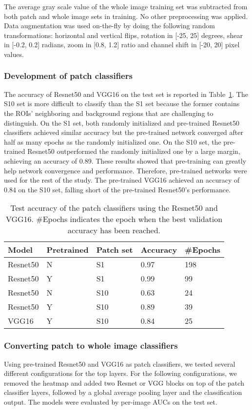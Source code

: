 \documentclass[12pt,letterpaper]{article}
\begin{document}
The average gray scale value of the whole image training set was subtracted from both patch and whole image sets in training. No other preprocessing was applied. Data augmentation was used on-the-fly by doing the following random transformations: horizontal and vertical flips, rotation in [-25, 25] degrees, shear in [-0.2, 0.2] radians, zoom in [0.8, 1.2] ratio and channel shift in [-20, 20] pixel values. 

\subsubsection{Development of patch classifiers}
The accuracy of Resnet50 and VGG16 on the test set is reported in Table~\ref{tab:patch_acc}. The S10 set is more difficult to classify than the S1 set because the former contains the ROIs' neighboring and background regions that are challenging to distinguish. On the S1 set, both randomly initialized and pre-trained Resnet50 classifiers achieved similar accuracy but the pre-trained network converged after half as many epochs as the randomly initialized one. On the S10 set, the pre-trained Resnet50 outperformed the randomly initialized one by a large margin, achieving an accuracy of 0.89. These results showed that pre-training can greatly help network convergence and performance. Therefore, pre-trained networks were used for the rest of the study. The pre-trained VGG16 achieved an accuracy of 0.84 on the S10 set, falling short of the pre-trained Resnet50's performance.

\begin{table}
\centering
\caption{Test accuracy of the patch classifiers using the Resnet50 and VGG16. \#Epochs indicates the epoch when the best validation accuracy has been reached.}
\label{tab:patch_acc}
\begin{tabular}{@{}lllll@{}}
\toprule
\textbf{Model} & \textbf{Pretrained} & \textbf{Patch set} & \textbf{Accuracy} & \textbf{\#Epochs} \\ \midrule
Resnet50 & N & S1 & 0.97 & 198 \\
Resnet50 & Y & S1 & 0.99 & 99 \\
Resnet50 & N & S10 & 0.63 & 24 \\
Resnet50 & Y & S10 & 0.89 & 39 \\
VGG16 & Y & S10 & 0.84 & 25 \\ \bottomrule
\end{tabular}
\end{table}

\subsubsection{Converting patch to whole image classifiers}
Using pre-trained Resnet50 and VGG16 as patch classifiers, we tested several different configurations for the top layers. For the following configurations, we removed the heatmap and added two Resnet or VGG blocks on top of the patch classifier layers, followed by a global average pooling layer and the classification output. The models were evaluated by per-image AUCs on the test set. 
\end{document}
